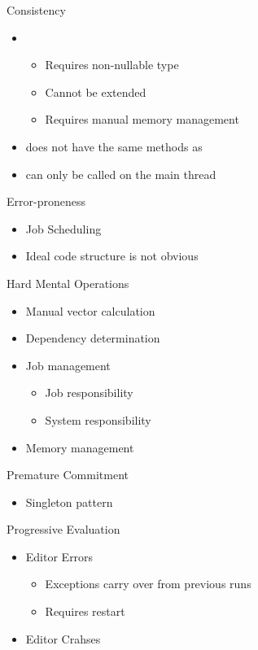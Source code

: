\begin{frame}{\secname}{\subsecname}
	Consistency
	\begin{itemize}
		\item {}
		\begin{itemize}
			\item Requires non-nullable type
			\item Cannot be extended
			\item Requires manual memory management
		\end{itemize}
		\item {} does not have the same methods as 
		\item {} can only be called on the main thread
	\end{itemize}
\end{frame}

\begin{frame}{\secname}{\subsecname}
	Error-proneness
	\begin{itemize}
		\item Job Scheduling
		\item Ideal code structure is not obvious
	\end{itemize}
\end{frame}

\begin{frame}{\secname}{\subsecname}
	Hard Mental Operations
	\begin{itemize}
		\item Manual vector calculation
		\item Dependency determination
		\item Job management
		\begin{itemize}
			\item Job responsibility
			\item System responsibility
		\end{itemize}
		\item Memory management
	\end{itemize}
\end{frame}

\begin{frame}{\secname}{\subsecname}
	Premature Commitment
	\begin{itemize}
		\item Singleton pattern
	\end{itemize}
\end{frame}

\begin{frame}{\secname}{\subsecname}
	Progressive Evaluation
	\begin{itemize}
		\item Editor Errors
		\begin{itemize}
			\item Exceptions carry over from previous runs
			\item Requires restart
		\end{itemize}
		\item Editor Crahses
	\end{itemize}
\end{frame}

